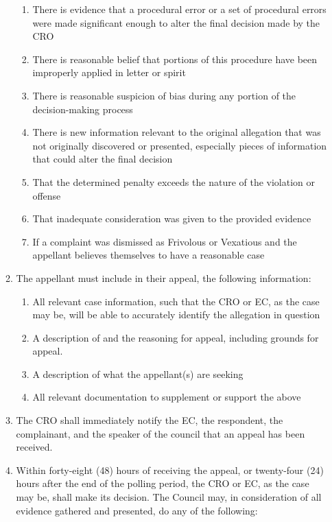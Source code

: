 \begin{enumerate}
\begin{enumerate}
        \begin{enumerate}
            \item There is evidence that a procedural error or a set of procedural errors were made significant enough to alter the final decision made by the CRO
            \item There is reasonable belief that portions of this procedure have been improperly applied in letter or spirit
            \item There is reasonable suspicion of bias during any portion of the decision-making process
            \item There is new information relevant to the original allegation that was not originally discovered or presented, especially pieces of information that could alter the final decision
            \item That the determined penalty exceeds the nature of the violation or offense
            \item That inadequate consideration was given to the provided evidence
            \item If a complaint was dismissed as Frivolous or Vexatious and the appellant believes themselves to have a reasonable case
        \end{enumerate}
        \item The appellant must include in their appeal, the following information:
        \begin{enumerate}
            \item All relevant case information, such that the CRO or EC, as the case may be, will be able to accurately identify the allegation in question
            \item A description of and the reasoning for appeal, including grounds for appeal.
            \item A description of what the appellant(s) are seeking
            \item All relevant documentation to supplement or support the above
        \end{enumerate}
        \item The CRO shall immediately notify the EC, the respondent, the complainant, and the speaker of the council  that an appeal has been received.
        \item Within forty-eight (48) hours of receiving the appeal, or twenty-four (24) hours after the end of the polling period, the CRO or EC, as the case may be, shall make its decision. The Council may, in consideration of all evidence gathered and presented, do any of the following:

\end{enumerate}
\end{enumerate}
